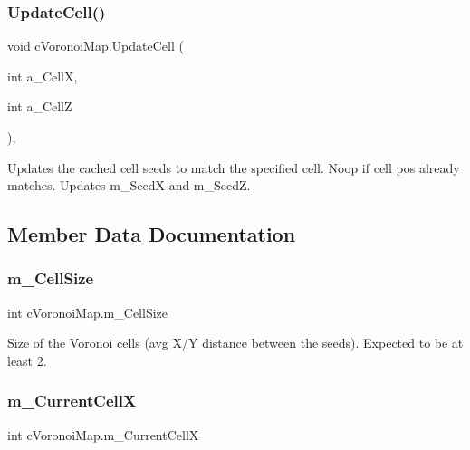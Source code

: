 \subsubsection{\texorpdfstring{Update\+Cell()}{UpdateCell()}}
{\footnotesize\ttfamily void c\+Voronoi\+Map.\+Update\+Cell (\begin{DoxyParamCaption}\item[{int}]{a\+\_\+\+CellX,  }\item[{int}]{a\+\_\+\+CellZ }\end{DoxyParamCaption})\hspace{0.3cm}{\ttfamily [inline]}, {\ttfamily [protected]}}

Updates the cached cell seeds to match the specified cell. Noop if cell pos already matches. Updates m\+\_\+\+SeedX and m\+\_\+\+SeedZ. 

\subsection{Member Data Documentation}
\mbox{\label{classc_voronoi_map_a4499b76db7e044d52c40482191ada510}} 
\subsubsection{\texorpdfstring{m\+\_\+\+Cell\+Size}{m\_CellSize}}
{\footnotesize\ttfamily int c\+Voronoi\+Map.\+m\+\_\+\+Cell\+Size\hspace{0.3cm}{\ttfamily [protected]}}

Size of the Voronoi cells (avg X/Y distance between the seeds). Expected to be at least 2. \mbox{\label{classc_voronoi_map_a7a3f75df3996c131803da750682b2c6b}} 
\subsubsection{\texorpdfstring{m\+\_\+\+Current\+CellX}{m\_CurrentCellX}}
{\footnotesize\ttfamily int c\+Voronoi\+Map.\+m\+\_\+\+Current\+CellX\hspace{0.3cm}{\ttfamily [protected]}}

